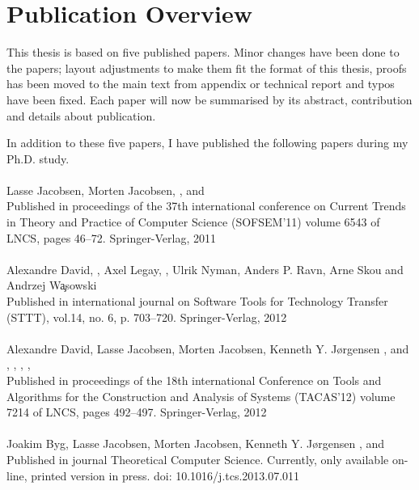 
\chapter{Publication Overview}

This thesis is based on five published papers. Minor changes have been done to the papers; layout adjustments to make them fit the format of this thesis, proofs has been moved to the main text from appendix or technical report and typos have been fixed. Each paper will now be summarised by its abstract, contribution and details about publication.

In addition to these five papers, I have published the following papers during my Ph.D. study.\\

\\
Lasse Jacobsen, Morten Jacobsen, \mhms, and \jiris\\
Published in proceedings of the 37th international conference on Current Trends in Theory and Practice of Computer Science (SOFSEM'11) volume 6543 of LNCS, pages 46--72. Springer-Verlag, 2011\\

\\
Alexandre David, \kims, Axel Legay, \mhms, Ulrik Nyman, Anders P. Ravn, Arne Skou and Andrzej W\c{a}sowski\\
Published in international journal on Software Tools for Technology Transfer (STTT), vol.14, no. 6, p. 703--720. Springer-Verlag, 2012\\

\\ Alexandre David, Lasse Jacobsen, Morten Jacobsen, Kenneth Y. J\o rgensen \mhms, and \jiris\\
\nikolas, \jans, \kims, \mhms, \jiris\\
Published in proceedings of the 18th international Conference on Tools and Algorithms for the Construction and Analysis of Systems (TACAS'12) volume 7214 of LNCS, pages 492--497. Springer-Verlag, 2012\\

\\
Joakim Byg, Lasse Jacobsen, Morten Jacobsen, Kenneth Y. J\o rgensen \mhms, and \jiris\\
Published in journal Theoretical Computer Science. Currently, only available on-line, printed version in press. doi: 10.1016/j.tcs.2013.07.011 \\

